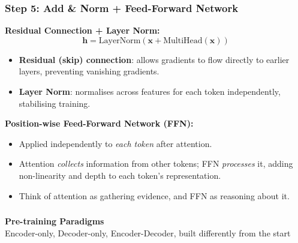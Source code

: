 \begin{frame}[fragile]\frametitle{Step 5: Add \& Norm + Feed-Forward Network}
\textbf{Residual Connection + Layer Norm:}
\[
  \mathbf{h} = \text{LayerNorm}(\mathbf{x} + \text{MultiHead}(\mathbf{x}))
\]
\begin{itemize}
\item \textbf{Residual (skip) connection}: allows gradients to flow directly to earlier layers, preventing vanishing gradients.
\item \textbf{Layer Norm}: normalises across features for each token independently, stabilising training.
\end{itemize}

\vspace{0.4em}
\textbf{Position-wise Feed-Forward Network (FFN):}
\begin{itemize}
\item Applied independently to \emph{each token} after attention.
\item Attention \emph{collects} information from other tokens; FFN \emph{processes} it,  adding non-linearity and depth to each token's representation.
\item Think of attention as gathering evidence, and FFN as reasoning about it.
\end{itemize}
\end{frame}



\begin{frame}[fragile]\frametitle{}
\begin{center}
{\Large \textbf{Pre-training Paradigms}}\\[0.5em]
{\normalsize Encoder-only, Decoder-only, Encoder-Decoder, built differently from the start}
\end{center}
\end{frame}

